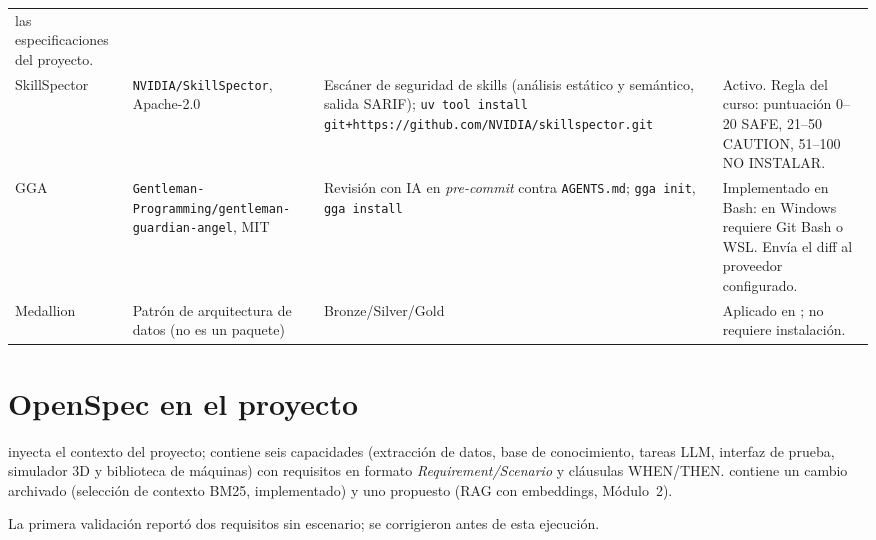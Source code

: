 \begin{longtable}{@{}P{2.0cm}P{3.6cm}P{4.6cm}P{4.9cm}@{}}
las especificaciones del proyecto.\\
SkillSpector & \texttt{NVIDIA/SkillSpector}, Apache-2.0 & Escáner de seguridad de skills (análisis estático y
semántico, salida SARIF); \texttt{uv tool install git+https://github.com/NVIDIA/skillspector.git} & Activo. Regla
del curso: puntuación 0--20 SAFE, 21--50 CAUTION, 51--100 NO INSTALAR.\\
GGA & \texttt{Gentleman-Programming/gentleman-guardian-angel}, MIT & Revisión con IA en \emph{pre-commit} contra
\texttt{AGENTS.md}; \texttt{gga init}, \texttt{gga install} & Implementado en Bash: en Windows requiere Git Bash o
WSL. Envía el diff al proveedor configurado.\\
Medallion & Patrón de arquitectura de datos (no es un paquete) & Bronze/Silver/Gold & Aplicado en
; no requiere instalación.\\\bottomrule
\end{longtable}

\section{OpenSpec en el proyecto}
 inyecta el contexto del proyecto;  contiene seis capacidades
(extracción de datos, base de conocimiento, tareas LLM, interfaz de prueba, simulador 3D y biblioteca de máquinas) con requisitos en formato
\emph{Requirement/Scenario} y cláusulas WHEN/THEN.  contiene un cambio archivado
(selección de contexto BM25, implementado) y uno propuesto (RAG con embeddings, Módulo~2).
\begin{evidencia}

La primera validación reportó dos requisitos sin escenario; se corrigieron antes de esta ejecución.
\end{evidencia}

